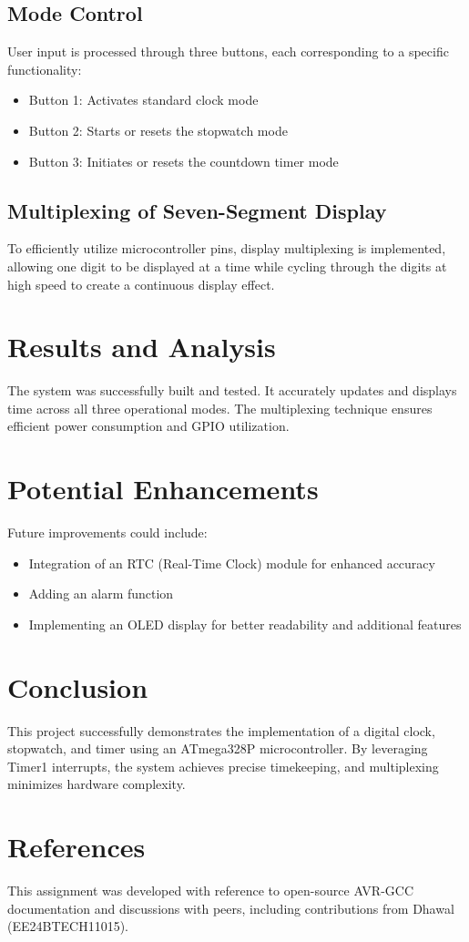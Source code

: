 \documentclass[journal]{IEEEtran}
\numberwithin{equation}{enumi}
\numberwithin{figure}{enumi}
\begin{document}
\subsection{Mode Control}
User input is processed through three buttons, each corresponding to a specific functionality:
\begin{itemize}
    \item Button 1: Activates standard clock mode
    \item Button 2: Starts or resets the stopwatch mode
    \item Button 3: Initiates or resets the countdown timer mode
\end{itemize}

\subsection{Multiplexing of Seven-Segment Display}
To efficiently utilize microcontroller pins, display multiplexing is implemented, allowing one digit to be displayed at a time while cycling through the digits at high speed to create a continuous display effect.

\section*{Results and Analysis}
The system was successfully built and tested. It accurately updates and displays time across all three operational modes. The multiplexing technique ensures efficient power consumption and GPIO utilization.

\section*{Potential Enhancements}
Future improvements could include:
\begin{itemize}
    \item Integration of an RTC (Real-Time Clock) module for enhanced accuracy
    \item Adding an alarm function
    \item Implementing an OLED display for better readability and additional features
\end{itemize}

\section*{Conclusion}
This project successfully demonstrates the implementation of a digital clock, stopwatch, and timer using an ATmega328P microcontroller. By leveraging Timer1 interrupts, the system achieves precise timekeeping, and multiplexing minimizes hardware complexity.

\section*{References}
This assignment was developed with reference to open-source AVR-GCC documentation and discussions with peers, including contributions from Dhawal (EE24BTECH11015).
\end{document}

